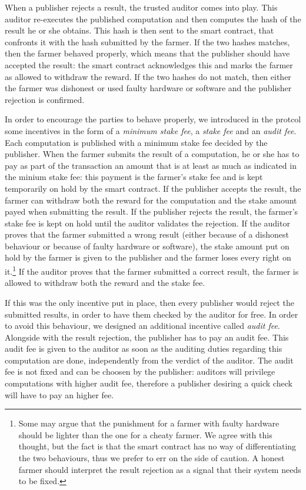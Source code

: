 When a publisher rejects a result, the trusted auditor comes into play. This auditor re-executes the published computation and then computes the hash of the result he or she obtains. This hash is then sent to the smart contract, that confronts it with the hash submitted by the farmer. If the two hashes matches, then the farmer behaved properly, which means that the publisher should have accepted the result: the smart contract acknowledges this and marks the farmer as allowed to withdraw the reward. If the two hashes do not match, then either the farmer was dishonest or used faulty hardware or software and the publisher rejection is confirmed.

In order to encourage the parties to behave properly, we introduced in the protcol some incentives in the form of a \emph{minimum stake fee}, a \emph{stake fee} and an \emph{audit fee}. Each computation is published with a minimum stake fee decided by the publisher. When the farmer submits the result of a computation, he or she has to pay as part of the transaction an amount that is at least as much as indicated in the minium stake fee: this payment is the farmer's stake fee and is kept temporarily on hold by the smart contract. If the publisher accepts the result, the farmer can withdraw both the reward for the computation and the stake amount payed when submitting the result. If the publisher rejects the result, the farmer's stake fee is kept on hold until the auditor validates the rejection. If the auditor proves that the farmer submitted a wrong result (either because of a dishonest behaviour or because of faulty hardware or software), the stake amount put on hold by the farmer is given to the publisher and the farmer loses every right on it.\footnote{Some may argue that the punishment for a farmer with faulty hardware should be lighter than the one for a cheaty farmer. We agree with this thought, but the fact is that the smart contract has no way of differentiating the two behaviours, thus we prefer to err on the side of caution. A honest farmer should interpret the result rejection as a signal that their system needs to be fixed.} If the auditor proves that the farmer submitted a correct result, the farmer is allowed to withdraw both the reward and the stake fee.

If this was the only incentive put in place, then every publisher would reject the submitted results, in order to have them checked by the auditor for free. In order to avoid this behaviour, we designed an additional incentive called \emph{audit fee}. Alongside with the result rejection, the publisher has to pay an audit fee. This audit fee is given to the auditor as soon as the auditing duties regarding this computation are done, independently from the verdict of the auditor. The audit fee is not fixed and can be choosen by the publisher: auditors will privilege computations with higher audit fee, therefore a publisher desiring a quick check will have to pay an higher fee.

